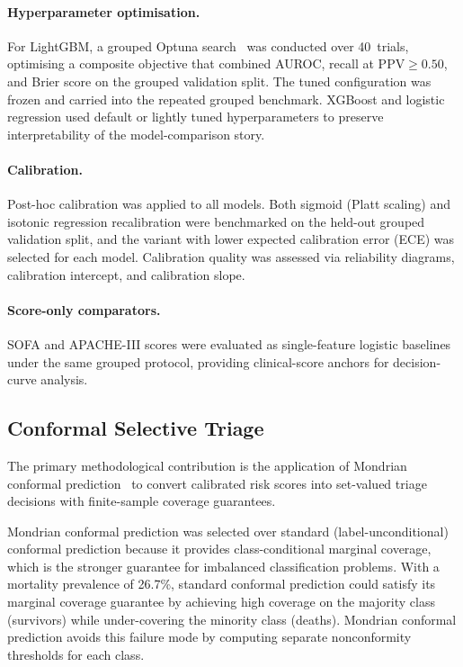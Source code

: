 \documentclass[11pt]{article}
\begin{document}
\paragraph{Hyperparameter optimisation.}
For LightGBM, a grouped Optuna search~\citep{Akiba2019} was conducted over
40~trials, optimising a composite objective that combined AUROC, recall at
$\text{PPV} \ge 0.50$, and Brier score on the grouped validation split.  The
tuned configuration was frozen and carried into the repeated grouped benchmark.
XGBoost and logistic regression used default or lightly tuned hyperparameters to
preserve interpretability of the model-comparison story.

\paragraph{Calibration.}
Post-hoc calibration was applied to all models.  Both sigmoid (Platt scaling)
and isotonic regression recalibration were benchmarked on the held-out grouped
validation split, and the variant with lower expected calibration error (ECE)
was selected for each model.  Calibration quality was assessed via reliability
diagrams, calibration intercept, and calibration slope.

\paragraph{Score-only comparators.}
SOFA and APACHE-III scores were evaluated as single-feature logistic baselines
under the same grouped protocol, providing clinical-score anchors for
decision-curve analysis.


\subsection{Conformal Selective Triage}\label{sec:conformal}

The primary methodological contribution is the application of Mondrian conformal
prediction~\citep{Vovk2005,Angelopoulos2021} to convert calibrated risk scores
into set-valued triage decisions with finite-sample coverage guarantees.

Mondrian conformal prediction was selected over standard (label-unconditional) conformal prediction because it provides class-conditional marginal coverage, which is the stronger guarantee for imbalanced classification problems. With a mortality prevalence of 26.7\%, standard conformal prediction could satisfy its marginal coverage guarantee by achieving high coverage on the majority class (survivors) while under-covering the minority class (deaths). Mondrian conformal prediction avoids this failure mode by computing separate nonconformity thresholds for each class.
\end{document}
